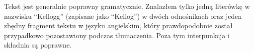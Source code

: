 Tekst jest generalnie poprawny gramatycznie. Znalazłem tylko jedną literówkę w nazwisku “Kellogg” (zapisane jako “Kellog”) w dwóch odnośnikach oraz jeden zbędny fragment tekstu w języku angielskim, który prawdopodobnie został przypadkowo pozostawiony podczas tłumaczenia. Poza tym interpunkcja i składnia są poprawne.